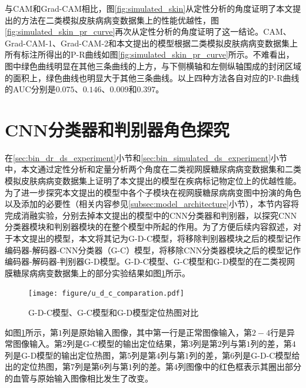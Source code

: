 与CAM和Grad-CAM相比，图\ref{fig:simulated_skin}从定性分析的角度证明了本文提出的方法在二类模拟皮肤病病变数据集上的性能优越性，图\ref{fig:simulated_skin_pr_curve}再次从定性分析的角度证明了这一结论。CAM、Grad-CAM-1、Grad-CAM-2和本文提出的模型根据二类模拟皮肤病病变数据集上所有标注所得出的P-R曲线如图\ref{fig:simulated_skin_pr_curve}所示。不难看出，图中绿色曲线明显在其他三条曲线的上方，与下侧横轴和左侧纵轴围成的封闭区域的面积上，绿色曲线也明显大于其他三条曲线。以上四种方法各自对应的P-R曲线的AUC分别是$0.075$、$0.146$、$0.009$和$0.397$。
\section{CNN分类器和判别器角色探究}\label{sec:g_c_g_d_g_d_c_comparsion}
在\ref{sec:bin_dr_ds_experiment}小节和\ref{sec:bin_simulated_ds_experiment}小节中，本文通过定性分析和定量分析两个角度在二类视网膜糖尿病病变数据集和二类模拟皮肤病病变数据集上证明了本文提出的模型在疾病标记物定位上的优越性能。为了进一步探究本文提出的模型中各个子模块在视网膜糖尿病病变图中扮演的角色以及添加的必要性（相关内容参见\ref{subsec:model_architecture}小节），本节内容将完成消融实验，分别去掉本文提出的模型中的CNN分类器和判别器，以探究CNN分类器模块和判别器模块的在整个模型中所起的作用。为了方便后续内容叙述，对于本文提出的模型，本文将其记为G-D-C模型，将移除判别器模块之后的模型记作编码器-解码器-CNN分类器（G-C）模型，将移除CNN分类器模块之后的模型记作编码器-解码器-判别器G-D模型。G-D-C模型、G-C模型和G-D模型的在二类视网膜糖尿病病变数据集上的部分实验结果如图\ref{fig:u_d_c_comparation}所示。
\begin{figure}[h]
	\centering
	\texttt{[image: figure/u\_d\_c\_comparation.pdf]}
	\caption{G-D-C模型、G-C模型和G-D模型定位热图对比} 
	\label{fig:u_d_c_comparation}
\end{figure}

如图\ref{fig:u_d_c_comparation}所示，第$1$列是原始输入图像，其中第一行是正常图像输入，第$2-4$行是异常图像输入。第$2$列是G-C模型的输出定位结果，第$3$列是第$2$列与第$1$列的差，第$4$列是G-D模型的输出定位热图，第$5$列是第$4$列与第$1$列的差，第$6$列是G-D-C模型给出的定位热图，第$7$列是第$6$列与第$1$列的差。第$4$列图像中的红色框表示其圈出部分的血管与原始输入图像相比发生了改变。

